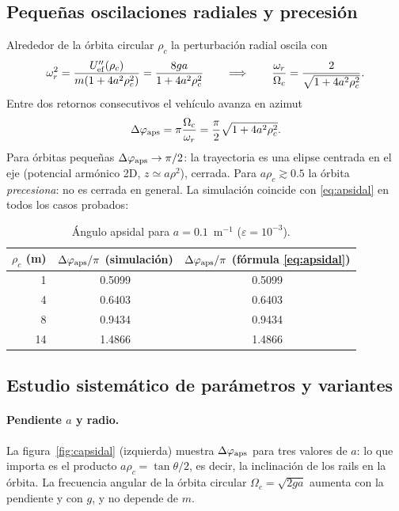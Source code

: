 \documentclass[11pt,a4paper]{article}
\begin{document}
\subsection{Pequeñas oscilaciones radiales y precesión}
Alrededor de la órbita circular $\rho_c$ la perturbación radial oscila con
\begin{equation}
 \omega_r^2=\frac{U_{\rm ef}''(\rho_c)}{m(1+4a^2\rho_c^2)}=\frac{8ga}{1+4a^2\rho_c^2}
 \qquad\Longrightarrow\qquad \frac{\omega_r}{\Omega_c}=\frac{2}{\sqrt{1+4a^2\rho_c^2}} .
\end{equation}
Entre dos retornos consecutivos el vehículo avanza en azimut
\begin{equation}\label{eq:apsidal}
 \Delta\varphi_{\rm aps}=\pi\frac{\Omega_c}{\omega_r}=\frac\pi2\sqrt{1+4a^2\rho_c^2}.
\end{equation}
Para órbitas pequeñas $\Delta\varphi_{\rm aps}\to\pi/2$: la trayectoria es una elipse centrada en el eje (potencial armónico 2D, $z\simeq a\rho^2$), cerrada.
Para $a\rho_c\gtrsim0.5$ la órbita \emph{precesiona}: no es cerrada en general. La simulación coincide con \eqref{eq:apsidal} en todos los casos probados:

\begin{table}[ht]\centering
\begin{tabular}{rcc}
\toprule
$\rho_c$ (m) & $\Delta\varphi_{\rm aps}/\pi$ (simulación) & $\Delta\varphi_{\rm aps}/\pi$ (fórmula \eqref{eq:apsidal})\\
\midrule
1 & 0.5099 & 0.5099\\
4 & 0.6403 & 0.6403\\
8 & 0.9434 & 0.9434\\
14 & 1.4866 & 1.4866\\
\bottomrule
\end{tabular}
\caption{Ángulo apsidal para $a=0.1$~m$^{-1}$ ($\varepsilon=10^{-3}$).}
\end{table}

\subsection{Estudio sistemático de parámetros y variantes}\label{sec:c:variantes}
\paragraph{Pendiente $a$ y radio.} La figura~\ref{fig:capsidal} (izquierda) muestra $\Delta\varphi_{\rm aps}$ para tres valores de $a$: lo que importa es el producto
$a\rho_c=\tan\theta/2$, es decir, la inclinación de los rails en la órbita.
La frecuencia angular de la órbita circular $\Omega_c=\sqrt{2ga}$ aumenta con la pendiente y con $g$, y no depende de $m$.
\end{document}
